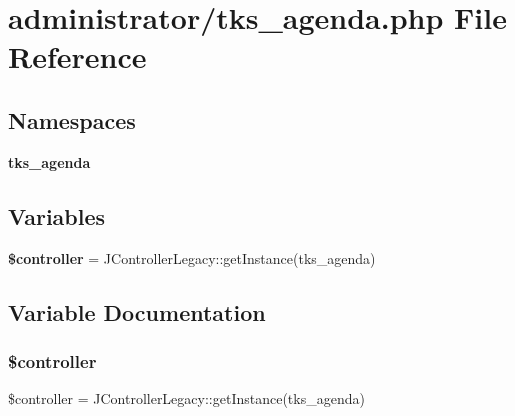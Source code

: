\section{administrator/tks\+\_\+agenda.php File Reference}
\label{administrator_2tks__agenda_8php}
\subsection*{Namespaces}
\begin{DoxyCompactItemize}
\item 
 \textbf{ tks\+\_\+agenda}
\end{DoxyCompactItemize}
\subsection*{Variables}
\begin{DoxyCompactItemize}
\item 
\textbf{ \$controller} = J\+Controller\+Legacy\+::get\+Instance(\textquotesingle{}tks\+\_\+agenda\textquotesingle{})
\end{DoxyCompactItemize}


\subsection{Variable Documentation}
\mbox{\label{administrator_2tks__agenda_8php_a388ef7b1db5e6f728e63cee704ce6e23}} 
\subsubsection{\$controller}
{\footnotesize\ttfamily \$controller = J\+Controller\+Legacy\+::get\+Instance(\textquotesingle{}tks\+\_\+agenda\textquotesingle{})}

